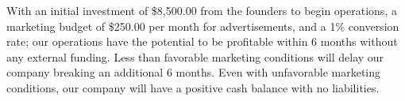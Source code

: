 With an initial investment of \$8,500.00 from the founders to begin operations, a marketing budget of \$250.00 per month for advertisements, and a 1\% conversion rate; our operations have the potential to be profitable within 6 months without any external funding. Less than favorable marketing conditions will delay our company breaking an additional 6 months. Even with unfavorable marketing conditions, our company will have a positive cash balance with no liabilities.





